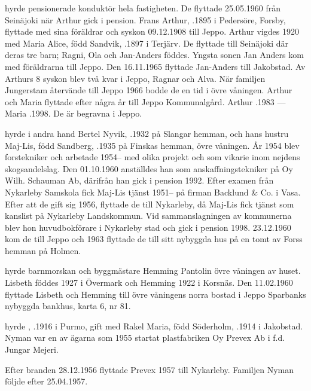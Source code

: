  hyrde pensionerade konduktör  hela fastigheten. De flyttade 25.05.1960 från Seinäjoki när Arthur gick i pension. Frans Arthur, .1895 i Pedersöre, Forsby, flyttade med sina föräldrar och syskon 09.12.1908 till Jeppo. Arthur vigdes 1920 med Maria Alice, född Sandvik, .1897 i Terjärv. De flyttade till Seinäjoki där deras tre barn; Ragni, Ola och Jan-Anders föddes. Yngsta sonen Jan Anders kom med föräldrarna till Jeppo. Den 16.11.1965 flyttade Jan-Anders till Jakobstad. Av Arthurs 8 syskon blev två kvar i Jeppo, Ragnar och Alva. När familjen Jungerstam återvände till Jeppo 1966 bodde de en tid i övre våningen. Arthur och Maria flyttade efter några år till Jeppo Kommunalgård.
Arthur .1983  ---  Maria .1998. De är begravna i Jeppo.

 hyrde i andra hand Bertel Nyvik, .1932 på Slangar hemman, och hans hustru Maj-Lis, född Sandberg, .1935 på Finskas hemman, övre våningen. År 1954 blev  forstekniker och arbetade 1954-- med olika projekt och som vikarie inom nejdens skogsandelslag. Den 01.10.1960 anställdes han som anskaffningstekniker på Oy Wilh. Schauman Ab, därifrån han gick i pension 1992. Efter examen från Nykarleby Samskola fick Maj-Lis tjänst 1951-- på firman Backlund \& Co. i Vasa. Efter att de gift sig 1956, flyttade de till Nykarleby, då Maj-Lis fick tjänst som kanslist på Nykarleby Landskommun. Vid sammanslagningen av kommunerna blev hon huvudbokförare i Nykarleby stad och gick i pension 1998. 23.12.1960 kom de till Jeppo och 1963 flyttade de till sitt nybyggda hus på en tomt av Forss hemman på Holmen.

 hyrde barnmorskan  och byggmästare Hemming Pantolin övre våningen av huset. Lisbeth föddes 1927 i Övermark och Hemming 1922 i Korsnäs. Den 11.02.1960 flyttade Lisbeth och Hemming till övre våningens norra bostad i Jeppo Sparbanks nybyggda bankhus, karta 6, nr 81.

 hyrde , .1916 i Purmo, gift med Rakel Maria, född Söderholm, .1914 i Jakobstad. Nyman var en av ägarna som 1955 startat plastfabriken Oy Prevex Ab i f.d. Jungar Mejeri.
\begin{jhchildren}
  \item {}
  \item {}
  \item {}
  \item {}
\end{jhchildren}
Efter branden 28.12.1956 flyttade Prevex 1957 till Nykarleby. Familjen Nyman följde efter 25.04.1957.

